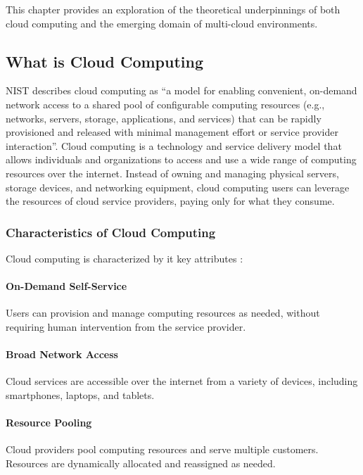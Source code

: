 This chapter provides an exploration of the theoretical underpinnings of 
both cloud computing and the emerging domain of multi-cloud environments.

\subsection{What is Cloud Computing}
NIST \cite{NISTCloudComputing} describes cloud computing as 
“a model for enabling convenient, on-demand network access to a shared pool of configurable computing resources 
(e.g., networks, servers, storage, applications, and services) that can be rapidly provisioned 
and released with minimal management effort or service provider interaction”.
Cloud computing is a technology and service delivery model that allows individuals and 
organizations to access and use a wide range of computing resources over the internet. 
Instead of owning and managing physical servers, storage devices, and networking equipment, 
cloud computing users can leverage the resources of cloud service providers, paying only for what they consume. 

\subsubsection{Characteristics of Cloud Computing}
Cloud computing is characterized by it key attributes \cite{mellNISTDefinitionCloud} \cite{oliveCloudComputingCharacteristics} \cite{gongCharacteristicsCloudComputing2010}:

\paragraph{On-Demand Self-Service}
Users can provision and manage computing resources as needed, without requiring human intervention from the service provider.

\paragraph{Broad Network Access}
Cloud services are accessible over the internet from a variety of devices, including smartphones, laptops, and tablets.

\paragraph{Resource Pooling}
Cloud providers pool computing resources and serve multiple customers. 
Resources are dynamically allocated and reassigned as needed.

